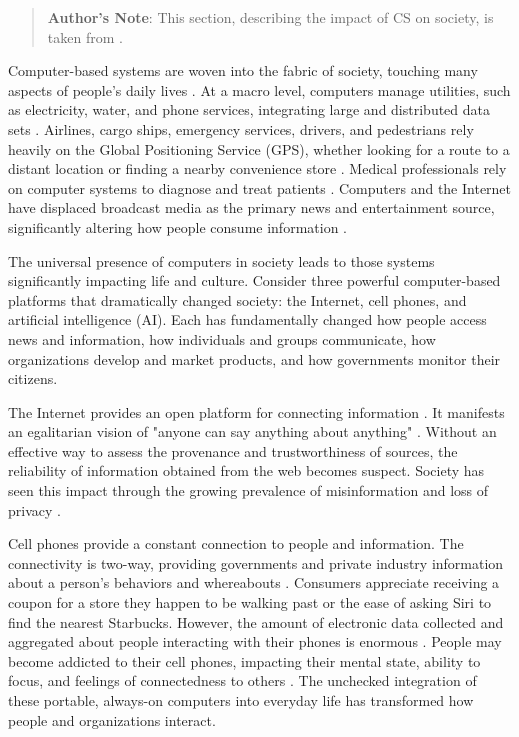 \begin{quotation}
\textbf{Author's Note}: This section, describing the impact of CS on society, is taken from \cite{read_why_nodate}.
\end{quotation}

Computer-based systems are woven into the fabric of society, touching many aspects of people's daily lives \parencite{koya_measuring_2020}. At a macro level, computers manage utilities, such as electricity, water, and phone services, integrating large and distributed data sets \parencite{koya_measuring_2020}. Airlines, cargo ships, emergency services, drivers, and pedestrians rely heavily on the Global Positioning Service (GPS), whether looking for a route to a distant location or finding a nearby convenience store \parencite{mcneff_global_2002}. Medical professionals rely on computer systems to diagnose and treat patients \parencite{cirillo_sex_2020}. Computers and the Internet have displaced broadcast media as the primary news and entertainment source, significantly altering how people consume information \parencite{chalaby_television_2016}.

The universal presence of computers in society leads to those systems significantly impacting life and culture. Consider three powerful computer-based platforms that dramatically changed society: the Internet, cell phones, and artificial intelligence (AI). Each has fundamentally changed how people access news and information, how individuals and groups communicate, how organizations develop and market products, and how governments monitor their citizens.

The Internet provides an open platform for connecting information \parencite{berners-lee_world-wide_2010}. It manifests an egalitarian vision of "anyone can say anything about anything" \parencite{noauthor_resource_nodate}. Without an effective way to assess the provenance and trustworthiness of sources, the reliability of information obtained from the web becomes suspect. Society has seen this impact through the growing prevalence of misinformation and loss of privacy \parencite{berners-lee_we_2014,zhou_survey_2020}. 

Cell phones provide a constant connection to people and information. The connectivity is two-way, providing governments and private industry information about a person's behaviors and whereabouts \parencite{dienlin_is_2015}. Consumers appreciate receiving a coupon for a store they happen to be walking past or the ease of asking Siri to find the nearest Starbucks. However, the amount of electronic data collected and aggregated about people interacting with their phones is enormous \parencite{dienlin_is_2015}. People may become addicted to their cell phones, impacting their mental state, ability to focus, and feelings of connectedness to others \parencite{de-sola_gutierrez_cell-phone_2016}. The unchecked integration of these portable, always-on computers into everyday life has transformed how people and organizations interact.

